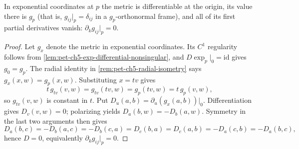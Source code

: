\begin{lemma}
  \label{lem:pet-ch5-normal-coords-jet}
  \leanok
  In exponential coordinates at $p$ the metric is differentiable at the origin, its
  value there is $g_p$ (that is, $g_{ij}|_p=\delta_{ij}$ in a $g_p$-orthonormal
  frame), and all of its first partial derivatives vanish: $\partial_kg_{ij}|_p=0$.
\end{lemma}
\begin{proof}
  \leanok
  \sketch
  Let $g_x$ denote the metric in exponential coordinates.  Its $C^1$ regularity
  follows from \cref{lem:pet-ch5-exp-differential-nonsingular}, and
  $D\exp_p|_0=\mathrm{id}$ gives $g_0=g_p$.  The radial identity in
  \cref{rem:pet-ch5-radial-isometry} says $g_x(x,w)=g_p(x,w)$.  Substituting
  $x=tv$ gives
  \[
    t\,g_{tv}(v,w)=g_{tv}(tv,w)=g_p(tv,w)=t\,g_p(v,w),
  \]
  so $g_{tv}(v,w)$ is constant in $t$.  Put
  $D_u(a,b)=\partial_u(g_x(a,b))|_0$.  Differentiation gives $D_v(v,w)=0$;
  polarizing yields $D_a(b,w)=-D_b(a,w)$.  Symmetry in the last two arguments then
  gives
  \[
    D_a(b,c)=-D_b(a,c)=-D_b(c,a)=D_c(b,a)=D_c(a,b)=-D_a(c,b)=-D_a(b,c),
  \]
  hence $D=0$, equivalently $\partial_kg_{ij}|_p=0$.
\end{proof}

